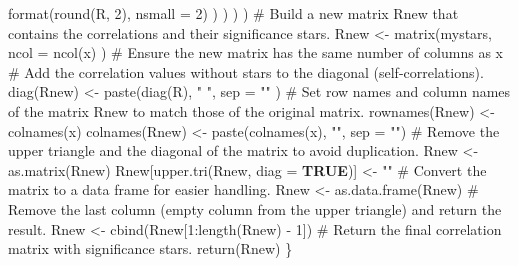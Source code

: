 \documentclass[
  bookmarksnumbered]{article}
\newenvironment{Shaded}{\begin{snugshade}}{\end{snugshade}}
\newcommand{\AttributeTok}[1]{\textcolor[rgb]{0.80,0.80,0.80}{#1}}
\newcommand{\CommentTok}[1]{\textcolor[rgb]{0.50,0.62,0.50}{#1}}
\newcommand{\ConstantTok}[1]{\textcolor[rgb]{0.86,0.64,0.64}{\textbf{#1}}}
\newcommand{\DecValTok}[1]{\textcolor[rgb]{0.86,0.86,0.80}{#1}}
\newcommand{\FunctionTok}[1]{\textcolor[rgb]{0.94,0.94,0.56}{#1}}
\newcommand{\NormalTok}[1]{\textcolor[rgb]{0.80,0.80,0.80}{#1}}
\newcommand{\OtherTok}[1]{\textcolor[rgb]{0.94,0.94,0.56}{#1}}
\newcommand{\SpecialCharTok}[1]{\textcolor[rgb]{0.86,0.64,0.64}{#1}}
\newcommand{\StringTok}[1]{\textcolor[rgb]{0.80,0.58,0.58}{#1}}
\begin{document}
\begin{Shaded}
\begin{Highlighting}[]
                                         \FunctionTok{format}\NormalTok{(}\FunctionTok{round}\NormalTok{(R, }\DecValTok{2}\NormalTok{), }\AttributeTok{nsmall =} \DecValTok{2}\NormalTok{)}
\NormalTok{                                  )}
\NormalTok{                           )}
\NormalTok{                    )}
\NormalTok{  )}
  \CommentTok{\# Build a new matrix \textquotesingle{}Rnew\textquotesingle{} that contains the correlations and their significance stars.}
\NormalTok{  Rnew }\OtherTok{\textless{}{-}} \FunctionTok{matrix}\NormalTok{(mystars,}
                 \AttributeTok{ncol =} \FunctionTok{ncol}\NormalTok{(x)}
\NormalTok{  ) }\CommentTok{\# Ensure the new matrix has the same number of columns as \textquotesingle{}x\textquotesingle{}}
  \CommentTok{\# Add the correlation values without stars to the diagonal (self{-}correlations).}
  \FunctionTok{diag}\NormalTok{(Rnew) }\OtherTok{\textless{}{-}} \FunctionTok{paste}\NormalTok{(}\FunctionTok{diag}\NormalTok{(R), }\StringTok{" "}\NormalTok{,}
                      \AttributeTok{sep =} \StringTok{""}
\NormalTok{  )}
  \CommentTok{\# Set row names and column names of the matrix \textquotesingle{}Rnew\textquotesingle{} to match those of the original matrix.}
  \FunctionTok{rownames}\NormalTok{(Rnew) }\OtherTok{\textless{}{-}} \FunctionTok{colnames}\NormalTok{(x)}
  \FunctionTok{colnames}\NormalTok{(Rnew) }\OtherTok{\textless{}{-}} \FunctionTok{paste}\NormalTok{(}\FunctionTok{colnames}\NormalTok{(x), }\StringTok{""}\NormalTok{, }\AttributeTok{sep =} \StringTok{""}\NormalTok{)}
  \CommentTok{\# Remove the upper triangle and the diagonal of the matrix to avoid duplication.}
\NormalTok{  Rnew }\OtherTok{\textless{}{-}} \FunctionTok{as.matrix}\NormalTok{(Rnew)}
\NormalTok{  Rnew[}\FunctionTok{upper.tri}\NormalTok{(Rnew, }\AttributeTok{diag =} \ConstantTok{TRUE}\NormalTok{)] }\OtherTok{\textless{}{-}} \StringTok{""}
  \CommentTok{\# Convert the matrix to a data frame for easier handling.}
\NormalTok{  Rnew }\OtherTok{\textless{}{-}} \FunctionTok{as.data.frame}\NormalTok{(Rnew)}
  \CommentTok{\# Remove the last column (empty column from the upper triangle) and return the result.}
\NormalTok{  Rnew }\OtherTok{\textless{}{-}} \FunctionTok{cbind}\NormalTok{(Rnew[}\DecValTok{1}\SpecialCharTok{:}\FunctionTok{length}\NormalTok{(Rnew) }\SpecialCharTok{{-}} \DecValTok{1}\NormalTok{])}
  \CommentTok{\# Return the final correlation matrix with significance stars.}
  \FunctionTok{return}\NormalTok{(Rnew)}
\NormalTok{\}}
\end{Highlighting}
\end{Shaded}
\end{document}
